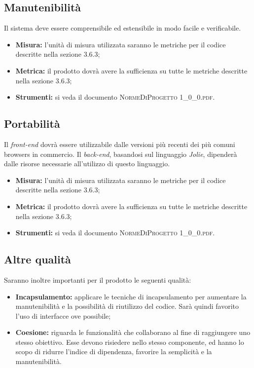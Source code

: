 	\subsection{Manutenibilità}
		Il sistema deve essere comprensibile ed estensibile in modo facile e verificabile.
		
		\begin{itemize}
			\item \textbf{Misura: }l’unità di misura utilizzata saranno le metriche per il codice descritte nella sezione 3.6.3;
			\item \textbf{Metrica: }il prodotto dovrà avere la sufficienza su tutte le metriche descritte nella sezione 3.6.3;
			\item \textbf{Strumenti: }si veda il documento \textsc{NormeDiProgetto 1\_0\_0.pdf}.
			
		\end{itemize}
	
	\subsection{Portabilità}
		Il \textit{front-end} dovrà essere utilizzabile dalle versioni più recenti dei più comuni browsers in commercio. 
		Il \textit{back-end}, basandosi sul linguaggio \textit{Jolie}, dipenderà dalle risorse necessarie all’utilizzo di questo linguaggio.
		
		\begin{itemize}
			\item \textbf{Misura: }l’unità di misura utilizzata saranno le metriche per il codice descritte nella sezione 3.6.3;
			\item \textbf{Metrica: }il prodotto dovrà avere la sufficienza su tutte le metriche descritte nella sezione 3.6.3;
			\item \textbf{Strumenti: }si veda il documento \textsc{NormeDiProgetto 1\_0\_0.pdf}.
			
		\end{itemize}
	
	\subsection{Altre qualità}
		Saranno inoltre importanti per il prodotto le seguenti qualità:
		
		\begin{itemize}
			\item \textbf{Incapsulamento: }applicare le tecniche di incapsulamento per aumentare la manutenibilità
			e la possibilità di riutilizzo del codice. Sarà quindi favorito l’uso di interfacce ove
			possibile;
			\item \textbf{Coesione: }riguarda le funzionalità che collaborano al fine di raggiungere uno stesso obiettivo. Esse devono risiedere nello stesso componente, ed hanno lo scopo di ridurre l’indice di dipendenza, favorire la semplicità e la manutenibilità.
			
		\end{itemize}
		
